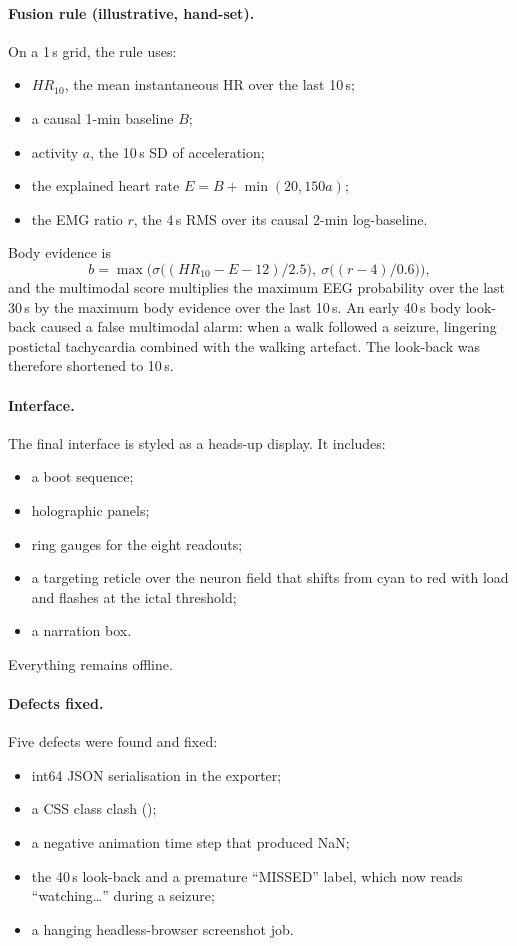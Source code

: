 \paragraph{Fusion rule (illustrative, hand-set).} On a 1\,s grid, the rule uses:
\begin{itemize}
\item $HR_{10}$, the mean instantaneous HR over the last 10\,s;
\item a causal 1-min baseline $B$;
\item activity $a$, the 10\,s SD of acceleration;
\item the explained heart rate $E = B + \min(20, 150a)$;
\item the EMG ratio $r$, the 4\,s RMS over its causal 2-min log-baseline.
\end{itemize}
Body evidence is
\begin{equation}
b = \max\!\Big(\sigma\big((HR_{10}-E-12)/2.5\big),\ \sigma\big((r-4)/0.6\big)\Big),
\end{equation}
and the multimodal score multiplies the maximum EEG probability over the last 30\,s by the maximum body evidence over the last 10\,s. An early 40\,s body look-back caused a false multimodal alarm: when a walk followed a seizure, lingering postictal tachycardia combined with the walking artefact. The look-back was therefore shortened to 10\,s.

\paragraph{Interface.} The final interface is styled as a heads-up display. It includes:
\begin{itemize}
\item a boot sequence;
\item holographic panels;
\item ring gauges for the eight readouts;
\item a targeting reticle over the neuron field that shifts from cyan to red with \Kp{} load and flashes at the ictal threshold;
\item a narration box.
\end{itemize}
Everything remains offline.

\paragraph{Defects fixed.} Five defects were found and fixed:
\begin{itemize}
\item int64 JSON serialisation in the exporter;
\item a CSS class clash ();
\item a negative animation time step that produced NaN;
\item the 40\,s look-back and a premature ``MISSED'' label, which now reads ``watching\dots'' during a seizure;
\item a hanging headless-browser screenshot job.
\end{itemize}
